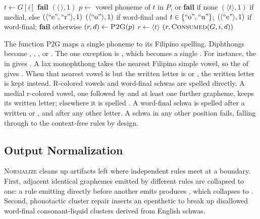 \begin{algorithm}[t]
      \caption{Phonetic Resolution}\label{alg:phonetic}
      \begin{algorithmic}[1]
            \State $t \gets G[i]$
             \Return \textbf{fail}
            \EndIf
             \Return $(\langle\,\rangle, 1)$
            \EndIf
            \State $p \gets$ vowel phoneme of $t$ in $P$, or \textbf{fail} if none
            \State \Return $(\langle t \rangle, 1)$ if medial, else $(\langle \gr{e}, \gr{r} \rangle, 1)$
            \EndIf
            \State \Return $(\langle \gr{o} \rangle, 1)$ if word-final and $t \in \{\gr{o}, \gr{u}\}$;
            \State \quad $(\langle \gr{e} \rangle, 1)$ if word-final; \textbf{fail} otherwise
            \EndIf
            \State $(r, d) \gets \Call{P2G}{p}$ 
            \State $r \gets \langle t \rangle$ 
            \EndIf
            \State \Return $(r, \Call{Consumed}{G, i, d})$
            \EndProcedure
      \end{algorithmic}
\end{algorithm}

The function \textsc{P2G} maps a single phoneme to its Filipino spelling.
Diphthongs become , , , or . The one exception is
, which becomes a single . For instance, the  in
 gives . A lax monophthong takes the nearest Filipino simple
vowel, so the \ipa{\ae} of  gives . When that nearest vowel is
 but the written letter is  or , the written letter is kept
instead. R-colored vowels and word-final schwas are spelled directly. A medial
r-colored vowel, one followed by  and at least one further grapheme,
keeps its written letter; elsewhere it is spelled . A word-final schwa
is spelled  after a written  or , and  after any other
letter. A schwa in any other position fails, falling through to the
context-free rules by design.

\subsection{Output Normalization}\label{subsec:normalization}

\textsc{Normalize} cleans up artifacts left where independent rules meet at a
boundary. First, adjacent identical graphemes emitted by different rules are
collapsed to one: a rule emitting  directly before another emits 
produces , which collapses to . Second, phonotactic cluster
repair inserts an epenthetic  to break up disallowed word-final
consonant-liquid clusters derived from English schwas.